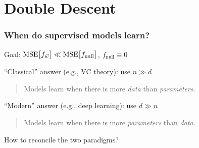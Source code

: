 \section{Double Descent}

      
        

\begin{frame}
  \frametitle{When do supervised models learn?}
  
  Goal: ${\mathrm{MSE}\big[f_{\vec{w}}\big]} \ll {\mathrm{MSE}\big[f_{\mathrm{null}}\big]}$,  $f_{\mathrm{null}}\equiv 0$

\pause
  
``Classical'' answer (e.g., VC theory): use $n \gg d$
  \begin{quote}
    Models learn when there is more \emph{data} than \emph{parameters}.
  \end{quote}
  
  \vspace{5mm}

  
``Modern'' answer (e.g., deep learning): use $d \gg n$
  \begin{quote}
    Models learn when there is more \emph{parameters} than \emph{data}.
  \end{quote}

  \vspace{5mm}

  How to reconcile the two paradigms?
\end{frame}

